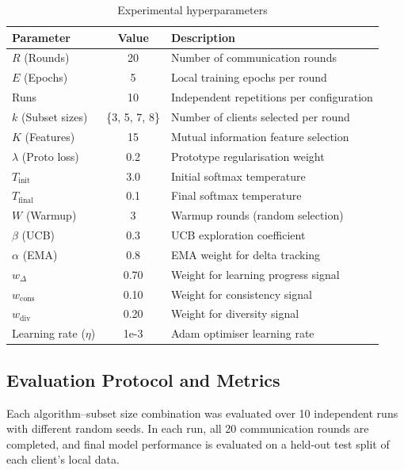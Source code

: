 \begin{table}[htbp]
\centering
\caption{Experimental hyperparameters}
\label{tab:hyperparams}
\begin{tabular}{|l|c|l|}
\hline
\textbf{Parameter} & \textbf{Value} & \textbf{Description} \\
\hline
$R$ (Rounds)             & 20    & Number of communication rounds \\
$E$ (Epochs)             & 5     & Local training epochs per round \\
Runs                     & 10    & Independent repetitions per configuration \\
$k$ (Subset sizes)       & \{3, 5, 7, 8\} & Number of clients selected per round \\
$K$ (Features)           & 15    & Mutual information feature selection \\
$\lambda$ (Proto loss)   & 0.2   & Prototype regularisation weight \\
$T_{\text{init}}$        & 3.0   & Initial softmax temperature \\
$T_{\text{final}}$       & 0.1   & Final softmax temperature \\
$W$ (Warmup)             & 3     & Warmup rounds (random selection) \\
$\beta$ (UCB)            & 0.3   & UCB exploration coefficient \\
$\alpha$ (EMA)           & 0.8   & EMA weight for delta tracking \\
$w_\Delta$               & 0.70  & Weight for learning progress signal \\
$w_{\text{cons}}$        & 0.10  & Weight for consistency signal \\
$w_{\text{div}}$         & 0.20  & Weight for diversity signal \\
Learning rate ($\eta$)   & 1e-3  & Adam optimiser learning rate \\
\hline
\end{tabular}
\end{table}

\subsection{Evaluation Protocol and Metrics}

Each algorithm--subset size combination was evaluated over 10 independent runs with different random seeds. In each run, all 20 communication rounds are completed, and final model performance is evaluated on a held-out test split of each client's local data.

